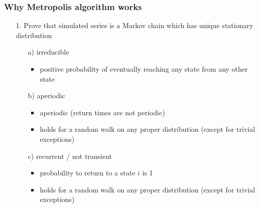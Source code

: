 \documentclass[10pt]{beamer}
\begin{document}
\begin{frame}

\frametitle{ Why Metropolis algorithm works}

  \begin{itemize}
  \item[1.] Prove that simulated series is a Markov chain
    which has unique stationary distribution
    \begin{itemize}
    \item[a)] irreducible
      \begin{itemize}
      \item<2->[=] positive probability of eventually reaching any
        state from any other state
      \end{itemize}
    \item[b)] aperiodic
      \begin{itemize}
      \item<3->[=] aperiodic (return times are not periodic)
      \item<3->[-] holds for a random walk on any proper distribution (except for trivial exceptions)
      \end{itemize}
    \item[c)] recurrent / not transient
      \begin{itemize}
      \item<4->[=] probability to return to a state $i$ is 1
      \item<4->[-] holds for a random walk on any proper distribution (except for trivial exceptions)
      \end{itemize}
    \end{itemize}
  \end{itemize}

\end{frame}
\end{document}
